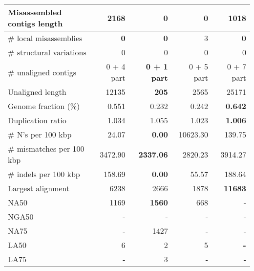 \documentclass[12pt,a4paper]{article}
\begin{document}
\begin{table}[ht]
\begin{center}
\begin{tabular}{|l*{4}{|r}|}
Misassembled contigs length & 2168 & {\bf 0} & {\bf 0} & 1018 \\ \hline
\# local misassemblies & {\bf 0} & {\bf 0} & 3 & {\bf 0} \\ \hline
\# structural variations & 0 & 0 & 0 & 0 \\ \hline
\# unaligned contigs & 0 + 4 part & {\bf 0 + 1 part} & 0 + 5 part & 0 + 7 part \\ \hline
Unaligned length & 12135 & {\bf 205} & 2565 & 25171 \\ \hline
Genome fraction (\%) & 0.551 & 0.232 & 0.242 & {\bf 0.642} \\ \hline
Duplication ratio & 1.034 & 1.055 & 1.023 & {\bf 1.006} \\ \hline
\# N's per 100 kbp & 24.07 & {\bf 0.00} & 10623.30 & 139.75 \\ \hline
\# mismatches per 100 kbp & 3472.90 & {\bf 2337.06} & 2820.23 & 3914.27 \\ \hline
\# indels per 100 kbp & 158.69 & {\bf 0.00} & 55.57 & 188.64 \\ \hline
Largest alignment & 6238 & 2666 & 1878 & {\bf 11683} \\ \hline
NA50 & 1169 & {\bf 1560} & 668 & - \\ \hline
NGA50 & - & - & - & - \\ \hline
NA75 & - & 1427 & - & - \\ \hline
LA50 & 6 & 2 & 5 & {\bf -} \\ \hline
LA75 & - & 3 & - & - \\ \hline
\end{tabular}
\end{center}
\end{table}
\end{document}
